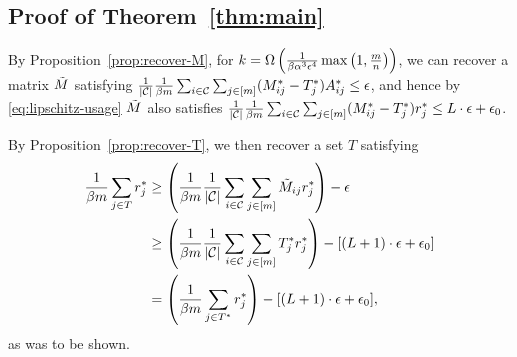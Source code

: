\subsection{Proof of Theorem~\ref{thm:main}}
\label{thm:main-proof}

By Proposition~\ref{prop:recover-M}, for $k = \Omega\left( \frac{1}{\beta\alpha^3\epsilon^4}\max\left( 1,\frac{m}{n} \right) \right)$, 
we can recover a matrix $\tilde{M}$ satisfying 
$\frac{1}{|\mathcal{C}|}\frac{1}{\beta m}\sum_{i \in \mathcal{C}}\sum_{j \in [m]} (M^*_{ij}-T^*_{j})A^*_{ij} \leq \epsilon$, 
and hence by \eqref{eq:lipschitz-usage} $\tilde{M}$ also satisfies
$\frac{1}{|\mathcal{C}|}\frac{1}{\beta m}\sum_{i \in \mathcal{C}}\sum_{j \in [m]} (M^*_{ij}-T^*_{j})r^*_{j} \leq L \cdot \epsilon + \epsilon_0$.

By Proposition~\ref{prop:recover-T}, we then recover a set $T$ satisfying
\begin{align}
\frac{1}{\beta m}\sum_{j \in T}r^*_j &\geq \left( \frac{1}{\beta m}\frac{1}{|\mathcal{C}|}\sum_{i \in \mathcal{C}}\sum_{j \in [m]} \tilde{M}_{ij}r^*_j \right) - \epsilon \\
 &\geq \left( \frac{1}{\beta m}\frac{1}{|\mathcal{C}|}\sum_{i \in \mathcal{C}}\sum_{j \in [m]} T^*_{j}r^*_j \right) - [(L+1)\cdot\epsilon+\epsilon_0] \\
 &= \left( \frac{1}{\beta m}\sum_{j \in T^*} r^*_j \right) - [(L+1)\cdot\epsilon+\epsilon_0],
\end{align}
as was to be shown.
